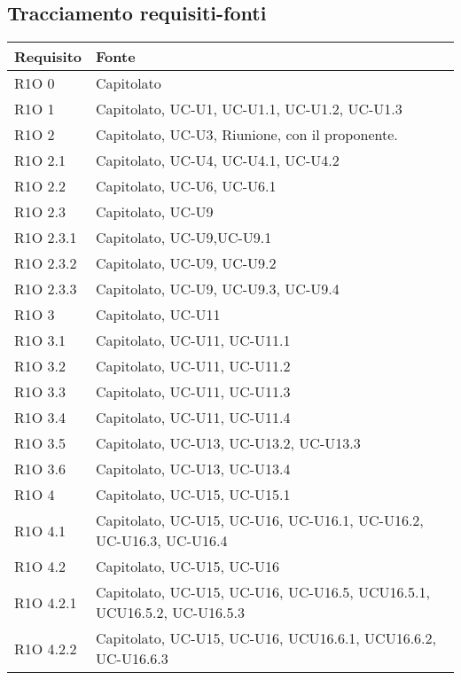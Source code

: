 \subsection{Tracciamento requisiti-fonti}

\begin{center}
  \bgroup
  \def\arraystretch{1.8}
  \begin{longtable}{ | l | p{8cm} | }
    \hline
    \cellcolor[gray]{0.9} \textbf{Requisito} &   
    \cellcolor[gray]{0.9} \textbf{Fonte}\\ \hline
    R1O 0 & Capitolato \\ \hline
    R1O 1 & Capitolato, UC-U1, UC-U1.1, UC-U1.2, UC-U1.3 \\ \hline
    R1O 2 & Capitolato, UC-U3, Riunione, con il proponente. \\ \hline
    R1O 2.1 & Capitolato, UC-U4, UC-U4.1, UC-U4.2 \\ \hline
    R1O 2.2 & Capitolato, UC-U6, UC-U6.1\\ \hline
    R1O 2.3 & Capitolato, UC-U9 \\ \hline
    R1O 2.3.1 & Capitolato, UC-U9,UC-U9.1 \\ \hline
    R1O 2.3.2 & Capitolato, UC-U9, UC-U9.2 \\ \hline
    R1O 2.3.3 & Capitolato, UC-U9, UC-U9.3, UC-U9.4\\ \hline
    R1O 3 & Capitolato, UC-U11 \\ \hline
    R1O 3.1 & Capitolato, UC-U11, UC-U11.1\\ \hline
    R1O 3.2 & Capitolato, UC-U11, UC-U11.2\\ \hline
    R1O 3.3 & Capitolato, UC-U11, UC-U11.3\\ \hline
    R1O 3.4 & Capitolato, UC-U11, UC-U11.4\\ \hline
    R1O 3.5 & Capitolato, UC-U13, UC-U13.2, UC-U13.3\\ \hline
    R1O 3.6 & Capitolato, UC-U13, UC-U13.4\\ \hline
    R1O 4 & Capitolato, UC-U15, UC-U15.1 \\ \hline
    R1O 4.1 & Capitolato, UC-U15, UC-U16, UC-U16.1, UC-U16.2, UC-U16.3, UC-U16.4 \\ \hline
    R1O 4.2 & Capitolato, UC-U15, UC-U16 \\ \hline
    R1O 4.2.1 & Capitolato, UC-U15, UC-U16, UC-U16.5, UCU16.5.1, UCU16.5.2, UC-U16.5.3 \\ \hline
    R1O 4.2.2 & Capitolato, UC-U15, UC-U16, UCU16.6.1, UCU16.6.2, UC-U16.6.3 \\ \hline

\end{longtable}
\end{center}
